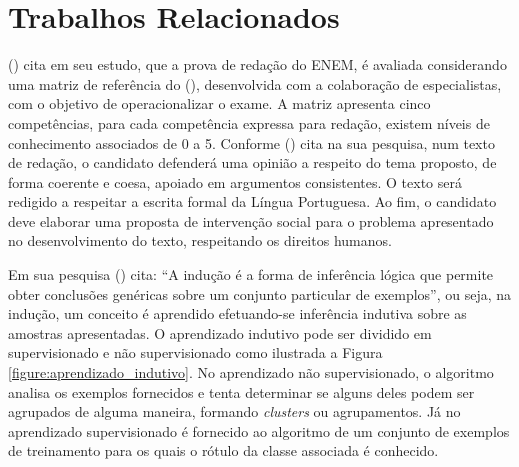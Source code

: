 \section{Trabalhos Relacionados}
\label{section:trabalhos_relacionados}

 (\citeyear{silvio_taynan:2017}) cita 
em seu estudo, que a prova de redação do ENEM, é avaliada considerando uma matriz 
de referência do \citeauthor{edital_enem:2016} (\citeyear{edital_enem:2016}), 
desenvolvida com a colaboração de especialistas, com o objetivo de 
operacionalizar o exame. A matriz apresenta cinco competências, para cada 
competência expressa para redação, existem níveis de conhecimento associados de 
0 a 5. Conforme  (\citeyear{braga:2015}) cita na
sua pesquisa, num texto de redação, o candidato defenderá uma opinião a 
respeito do tema proposto, de forma coerente e coesa, apoiado em argumentos 
consistentes. O texto será redigido a respeitar a escrita formal da Língua 
Portuguesa. Ao fim, o candidato deve elaborar uma proposta de intervenção 
social para o problema apresentado no desenvolvimento do texto, respeitando os 
direitos humanos.

Em sua pesquisa  
(\citeyear{monard_baranauskas:2003}) cita: ``A indução é a forma de 
inferência lógica que permite obter conclusões genéricas sobre um conjunto 
particular de exemplos'', ou seja, na indução, um conceito é aprendido 
efetuando-se inferência indutiva sobre as amostras apresentadas. O aprendizado 
indutivo pode ser dividido em supervisionado e não supervisionado como 
ilustrada a Figura \ref{figure:aprendizado_indutivo}. No aprendizado não 
supervisionado, o algoritmo analisa os exemplos fornecidos e tenta determinar 
se alguns deles podem ser agrupados de alguma maneira, formando 
\textit{clusters} ou agrupamentos. Já no aprendizado supervisionado é fornecido 
ao algoritmo de um conjunto de exemplos de treinamento para os quais o rótulo 
da classe associada é conhecido.

